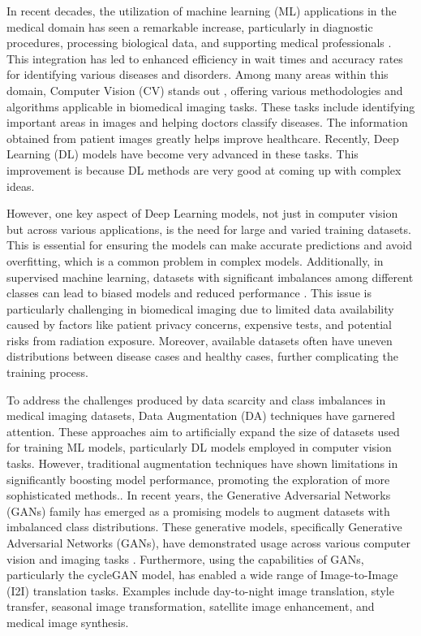 \documentclass[UKenglish,12pt]{master-style}
\begin{document}
In recent decades, the utilization of machine learning (ML) applications in the medical domain has seen a remarkable increase, particularly in diagnostic procedures, processing biological data, and supporting medical professionals \cite{Shad_2021}. This integration has led to enhanced efficiency in wait times and accuracy rates for identifying various diseases and disorders. Among many areas within this domain, Computer Vision (CV) stands out , offering various methodologies and algorithms applicable in biomedical imaging tasks. These tasks include identifying important areas in images and helping doctors classify diseases. The information obtained from patient images greatly helps improve healthcare. Recently, Deep Learning (DL) models have become very advanced in these tasks. This improvement is because DL methods are very good at coming up with complex ideas.

However, one key aspect of Deep Learning models, not just in computer vision but across various applications, is the need for large and varied training datasets. This is essential for ensuring the models can make accurate predictions and avoid overfitting, which is a common problem in complex models. Additionally, in supervised machine learning, datasets with significant imbalances among different classes can lead to biased models and reduced performance \cite{RASHIDI20192374289519873088} . This issue is particularly challenging in biomedical imaging due to limited data availability caused by factors like patient privacy concerns, expensive tests, and potential risks from radiation exposure. Moreover, available datasets often have uneven distributions between disease cases and healthy cases, further complicating the training process. 

To address the challenges produced by data scarcity and class imbalances in medical imaging datasets, Data Augmentation (DA) techniques have garnered attention. These approaches aim to artificially expand the size of datasets used for training ML models, particularly DL models employed in computer vision tasks. However, traditional augmentation techniques have shown limitations in significantly boosting model performance, promoting the exploration of more sophisticated methods.\cite{MUMUNI2022100258}.
In recent years, the Generative Adversarial Networks (GANs) family has emerged as a promising models to augment datasets with imbalanced class distributions. These generative models, specifically Generative Adversarial Networks (GANs), have demonstrated usage across various computer vision and imaging tasks \cite{10.1007/978-3-031-45673-2}. Furthermore, using the capabilities of GANs, particularly the cycleGAN model, has enabled a wide range of Image-to-Image (I2I) translation tasks. Examples include day-to-night image translation, style transfer, seasonal image transformation, satellite image enhancement, and medical image synthesis. 
\end{document}
